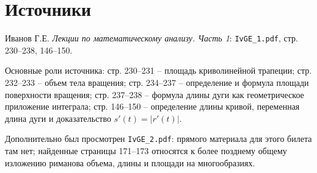 \documentclass[12pt,a4paper]{article}
\begin{document}
\section*{Источники}

Иванов Г.Е. \emph{Лекции по математическому анализу. Часть 1}:
\texttt{IvGE\_1.pdf}, стр. 230--238, 146--150.

Основные роли источника: стр. 230--231 -- площадь криволинейной трапеции;
стр. 232--233 -- объем тела вращения; стр. 234--237 -- определение и формула
площади поверхности вращения; стр. 237--238 -- формула длины дуги как
геометрическое приложение интеграла; стр. 146--150 -- определение длины кривой,
переменная длина дуги и доказательство \(s'(t)=|r'(t)|\).

Дополнительно был просмотрен \texttt{IvGE\_2.pdf}: прямого материала для
этого билета там нет; найденные страницы 171--173 относятся к более позднему
общему изложению риманова объема, длины и площади на многообразиях.
\end{document}

